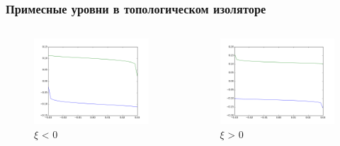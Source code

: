 \documentclass{beamer}
\begin{document}
\begin{frame}
    \frametitle{Примесные уровни в топологическом изоляторе}
    \begin{columns}
        \begin{column}{0.5\linewidth}
        \begin{figure}[h]
            \centering
            \includegraphics[width=0.95\linewidth]{green_functions.png}
            \caption{$\xi$ < 0}
        \end{figure}
        \end{column}
        \begin{column}{0.5\linewidth}
        \begin{figure}[h]
            \centering
            \includegraphics[width=0.95\linewidth]{green_functions_1.png}
            \caption{$\xi$ > 0}
        \end{figure}
        \end{column}
    \end{columns}
\end{frame}
\end{document}
